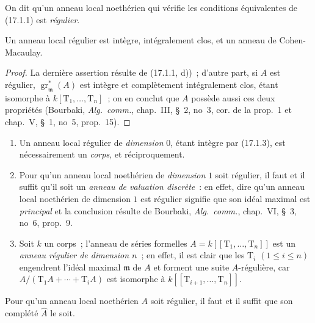 \begin{definition}[17.1.2]
\label{0.17.1.2-fr}
On dit qu'un anneau local noethérien qui vérifie les conditions équivalentes de
(17.1.1) est \emph{régulier}.
\end{definition}

\begin{corollary}[17.1.3]
\label{0.17.1.3-fr}
Un anneau local régulier est intègre, intégralement clos, et un anneau de
Cohen-Macaulay.
\end{corollary}

\begin{proof}
La dernière assertion résulte de (17.1.1, d))~; d'autre part, si $A$ est
régulier, $\operatorname{gr}^*_{\mathfrak{m}}(A)$ est intègre et complètement
intégralement clos, étant isomorphe à $k[\mathrm{T}_1,\ldots,\mathrm{T}_n]$~;
on en conclut que $A$ possède aussi ces deux propriétés (Bourbaki,
\emph{Alg.~comm.}, chap.~III, \S~2, no~3, cor. de la prop.~1 et chap.~V,
\S~1, no~5, prop.~15).
\end{proof}

\begin{examples}[17.1.4]
\label{0.17.1.4-fr}
\begin{enumerate}
  \item[\rm (i)] Un anneau local régulier de \emph{dimension} $0$, étant
  intègre par (17.1.3), est nécessairement un \emph{corps}, et réciproquement.
  \item[\rm (ii)] Pour qu'un anneau local noethérien de \emph{dimension} $1$
  soit régulier, il faut et il suffit qu'il soit un \emph{anneau de valuation
  discrète}~: en effet, dire qu'un anneau local noethérien de dimension $1$ est
  régulier signifie que son idéal maximal est \emph{principal} et la conclusion
  résulte de Bourbaki, \emph{Alg.~comm.}, chap.~VI, \S~3, no~6, prop.~9.
  \item[\rm (iii)] Soit $k$ un corps~; l'anneau de séries formelles
  $A=k[[\mathrm{T}_1,\ldots,\mathrm{T}_n]]$ est un \emph{anneau régulier de
  dimension $n$}~; en effet, il est clair que les $\mathrm{T}_i$
  $(1\leq i\leq n)$ engendrent l'idéal maximal $\mathfrak{m}$ de $A$ et
  forment une suite $A$-régulière, car
  $A/(\mathrm{T}_1A+\cdots+\mathrm{T}_iA)$ est isomorphe à
  $k[[\mathrm{T}_{i+1},\ldots,\mathrm{T}_n]]$.
\end{enumerate}
\end{examples}

\begin{proposition}[17.1.5]
\label{0.17.1.5-fr}
Pour qu'un anneau local noethérien $A$ soit régulier, il faut et il suffit que
son complété $\widehat{A}$ le soit.
\end{proposition}

